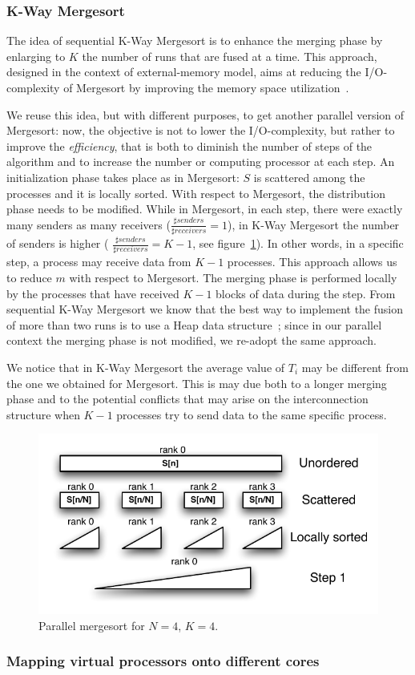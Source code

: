 \subsubsection{K-Way Mergesort}
The idea of sequential K-Way Mergesort is to enhance the merging phase by enlarging to $K$ the number of runs that are fused at a time. This approach, designed in the context of external-memory model, aims at reducing the I/O-complexity of Mergesort by improving the memory space utilization~\cite{FERR}. 

We reuse this idea, but with different purposes, to get another parallel version of Mergesort: now, the objective is not to lower the I/O-complexity, but rather to improve the \textit{efficiency}, that is both to diminish the number of steps of the algorithm and to increase the number or computing processor at each step. An initialization phase takes place as in Mergesort: $S$ is scattered among the processes and it is locally sorted. With respect to Mergesort, the distribution phase needs to be modified. While in Mergesort, in each step, there were exactly many senders as many receivers ($\frac{\sharp senders}{\sharp receivers} = 1$), in K-Way Mergesort the number of senders is higher ( $\frac{\sharp senders}{\sharp receivers} = K - 1$, see figure~\ref{k-merge-dist}). In other words, in a specific step, a process may receive data from $K-1$ processes. This approach allows us to reduce $m$ with respect to Mergesort. The merging phase is performed locally by the processes that have received $K-1$ blocks of data during the step. From sequential K-Way Mergesort we know that the best way to implement the fusion of more than two runs is to use a Heap data structure~\cite{FERR}; since in our parallel context the merging phase is not modified, we re-adopt the same approach.

We notice that in K-Way Mergesort the average value of $T_i$ may be different from the one we obtained for Mergesort. This is may due both to a longer merging phase and to the potential conflicts that may arise on the interconnection structure when $K-1$ processes try to send data to the same specific process.

\begin{figure}[h]
        \centerline{
               \mbox{\includegraphics[scale=0.70]{kmerge-pict1}}
        }
        \caption{Parallel mergesort for $N = 4$, $K = 4$.}
        \label{k-merge-dist}
\end{figure}

\subsubsection*{Mapping virtual processors onto different cores} 
